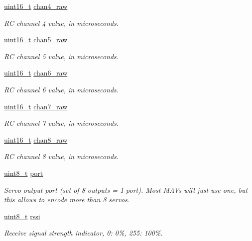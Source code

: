 \begin{DoxyCompactItemize}
\hyperlink{stdint_8h_a273cf69d639a59973b6019625df33e30}{uint16\-\_\-t} \hyperlink{struct____mavlink__rc__channels__raw__t_a5c7b02424976def78bae64edb08b4c60}{chan4\-\_\-raw}
\begin{DoxyCompactList}\small\item\em R\-C channel 4 value, in microseconds. \end{DoxyCompactList}\item 
\hyperlink{stdint_8h_a273cf69d639a59973b6019625df33e30}{uint16\-\_\-t} \hyperlink{struct____mavlink__rc__channels__raw__t_add8ae2761f8b65c92d0d2cc4f2e836fd}{chan5\-\_\-raw}
\begin{DoxyCompactList}\small\item\em R\-C channel 5 value, in microseconds. \end{DoxyCompactList}\item 
\hyperlink{stdint_8h_a273cf69d639a59973b6019625df33e30}{uint16\-\_\-t} \hyperlink{struct____mavlink__rc__channels__raw__t_a4f2114cbf6637d9b0c661f08d54c9958}{chan6\-\_\-raw}
\begin{DoxyCompactList}\small\item\em R\-C channel 6 value, in microseconds. \end{DoxyCompactList}\item 
\hyperlink{stdint_8h_a273cf69d639a59973b6019625df33e30}{uint16\-\_\-t} \hyperlink{struct____mavlink__rc__channels__raw__t_a6cccd33a0b2b888a3671e66e0c88d799}{chan7\-\_\-raw}
\begin{DoxyCompactList}\small\item\em R\-C channel 7 value, in microseconds. \end{DoxyCompactList}\item 
\hyperlink{stdint_8h_a273cf69d639a59973b6019625df33e30}{uint16\-\_\-t} \hyperlink{struct____mavlink__rc__channels__raw__t_ac4181e5b2c297dbe24431a4ca1d1493e}{chan8\-\_\-raw}
\begin{DoxyCompactList}\small\item\em R\-C channel 8 value, in microseconds. \end{DoxyCompactList}\item 
\hyperlink{stdint_8h_aba7bc1797add20fe3efdf37ced1182c5}{uint8\-\_\-t} \hyperlink{struct____mavlink__rc__channels__raw__t_a3d166207003ffe9bfc68b3461ae1f03c}{port}
\begin{DoxyCompactList}\small\item\em Servo output port (set of 8 outputs = 1 port). Most M\-A\-Vs will just use one, but this allows to encode more than 8 servos. \end{DoxyCompactList}\item 
\hyperlink{stdint_8h_aba7bc1797add20fe3efdf37ced1182c5}{uint8\-\_\-t} \hyperlink{struct____mavlink__rc__channels__raw__t_a23cda9263105190c2278e2bb1264a886}{rssi}
\begin{DoxyCompactList}\small\item\em Receive signal strength indicator, 0\-: 0\%, 255\-: 100\%. \end{DoxyCompactList}\end{DoxyCompactItemize}


